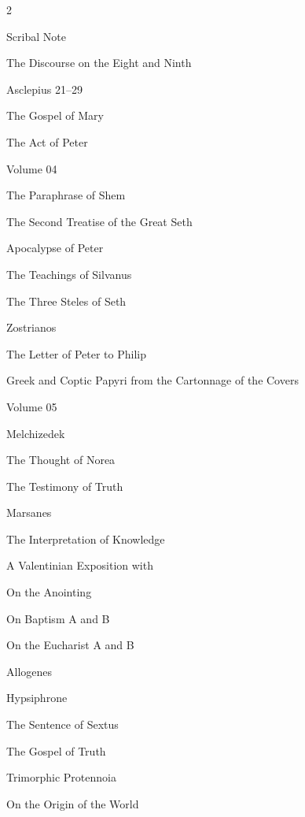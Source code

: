 \begin{multicols}{2}
\begin{compactitem}
\begin{compactitem}
							\item Scribal Note
							\item The Discourse on the Eight and Ninth
							\item Asclepius 21--29
							\item The Gospel of Mary
							\item The Act of Peter
						\end{compactitem}
					\item Volume 04
						\begin{compactitem}
							\item The Paraphrase of Shem
							\item The Second Treatise of the Great Seth
							\item Apocalypse of Peter
							\item The Teachings of Silvanus
							\item The Three Steles of Seth
							\item Zostrianos
							\item The Letter of Peter to Philip
							\item Greek and Coptic Papyri from the Cartonnage of the Covers
						\end{compactitem}
					\item Volume 05
						\begin{compactitem}
							\item Melchizedek
							\item The Thought of Norea
							\item The Testimony of Truth
							\item Marsanes
							\item The Interpretation of Knowledge
							\item A Valentinian Exposition with 
								\begin{compactitem}
									\item On the Anointing
									\item On Baptism A and B
									\item On the Eucharist A and B
								\end{compactitem}
							\item Allogenes
							\item Hypsiphrone
							\item The Sentence of Sextus
							\item The Gospel of Truth
							\item Trimorphic Protennoia
							\item On the Origin of the World
						\end{compactitem}
				\end{compactitem}
			

\end{multicols}
